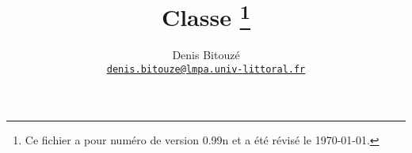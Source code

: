 \title{Classe \yat\thanks{Ce fichier a pour numéro de version 0.99n et
    a été révisé le \today.}%
}
%
\author{%
  Denis Bitouzé\\
  \texorpdfstring{%
    \href{mailto:denis.bitouze@lmpa.univ-littoral.fr}%
    {\nolinkurl{denis.bitouze@lmpa.univ-littoral.fr}}%
  }{%
    denis.bitouze@lmpa.univ-littoral.fr%
  }%
}
%
\maketitle

\iffalse
\fi
